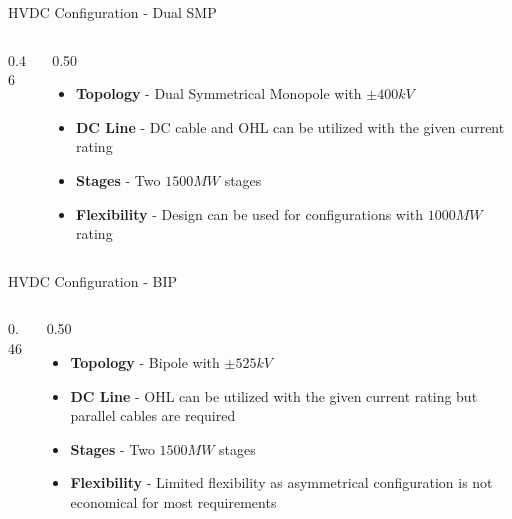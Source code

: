\begin{frame}{HVDC Configuration - Dual SMP}
  \begin{columns}[c,onlytextwidth]
    \begin{column}{0.46\textwidth}
      \centering
    \end{column}
    \begin{column}{0.50\textwidth}
      \vspace{0.5em}
      \begin{itemize}
        \setlength{\itemsep}{0.7em}
        \item \textbf{Topology} - Dual Symmetrical Monopole with $\pm400kV$
        \item \textbf{DC Line} - DC cable and OHL can be utilized with the given current rating
        \item \textbf{Stages} - Two $1500MW$ stages
        \item \textbf{Flexibility} - Design can be used for configurations with $1000MW$ rating
      \end{itemize}
    \end{column}
  \end{columns}
\end{frame}


\begin{frame}{HVDC Configuration - BIP}
  \begin{columns}[c,onlytextwidth]
    \begin{column}{0.46\textwidth}
      \centering
    \end{column}
    \begin{column}{0.50\textwidth}
      \vspace{0.5em}
      \begin{itemize}
        \setlength{\itemsep}{0.7em}
        \item \textbf{Topology} - Bipole with $\pm525kV$
        \item \textbf{DC Line} - OHL can be utilized with the given current rating but parallel cables are required
        \item \textbf{Stages} - Two $1500MW$ stages
        \item \textbf{Flexibility} - Limited flexibility as asymmetrical configuration is not economical for most requirements
      \end{itemize}
    \end{column}
  \end{columns}
\end{frame}


